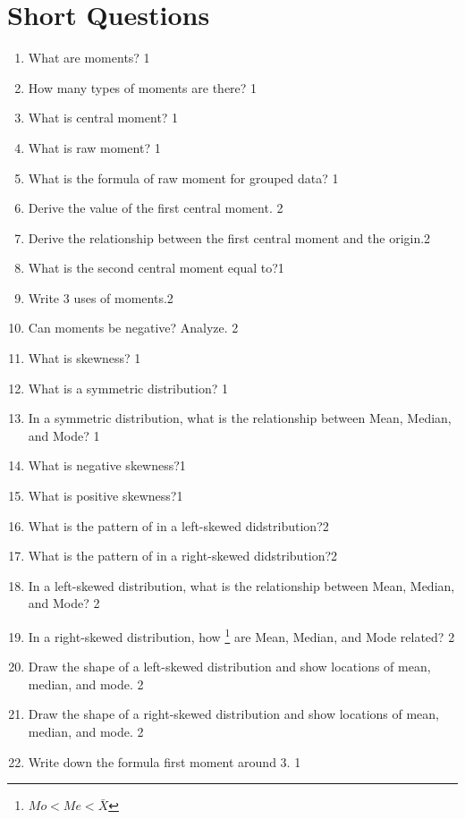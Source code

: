 \documentclass[a4paper,oneside]{book}
\begin{document}
\section{Short Questions}
\begin{enumerate}
    \item What are moments? \hfill 1
    \item How many types of moments are there?  \hfill 1
    \item What is central moment? \hfill 1
    \item  What is raw moment? \hfill 1
    \item  What is the formula of raw moment for grouped data? \hfill 1
    \item Derive the value of the first central moment. \hfill 2
    \item  Derive the relationship between the first central moment and the origin.\hfill 2
    \item What is the second central moment equal to?\hfill 1
    \item Write 3 uses of moments.\hfill 2
    \item Can moments be negative? Analyze. \hfill 2
    \item What is skewness? \hfill 1
    \item What is a symmetric distribution? \hfill 1
    \item In a symmetric distribution, what is the relationship between Mean, Median, and Mode? \hfill 1
    \item What is negative skewness?\hfill 1
    \item What is positive skewness?\hfill 1
    \item What is the pattern of in a left-skewed didstribution?\hfill 2
    \item What is the pattern of in a right-skewed didstribution?\hfill 2
    \item In a left-skewed distribution, what is the relationship between Mean, Median, and Mode? \hfill 2
    \item In a right-skewed distribution, how \footnote{$Mo < Me < \bar X$} are Mean, Median, and Mode related?  \hfill 2
    \item Draw the shape of a left-skewed distribution and show locations of mean, median, and mode.  \hfill 2
    \item Draw the shape of a right-skewed distribution and show locations of mean, median, and mode.  \hfill 2
      \item Write down the formula first moment around 3. \hfill 1

\end{enumerate}
\end{document}
